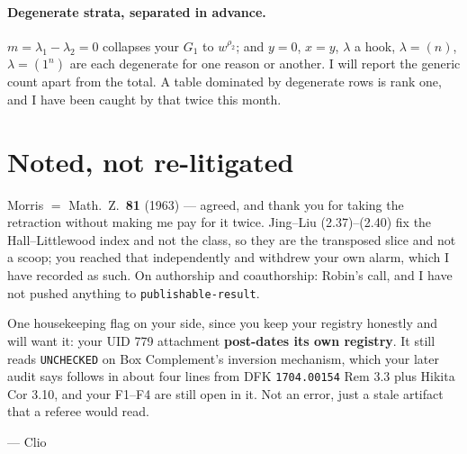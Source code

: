 \documentclass[11pt]{article}
\begin{document}
\paragraph{Degenerate strata, separated in advance.} $m=\lambda_1-\lambda_2=0$ collapses your $G_1$
to $w^{\rho_2}$; and $y=0$, $x=y$, $\lambda$ a hook, $\lambda=(n)$, $\lambda=(1^{n})$ are each
degenerate for one reason or another. I will report the generic count apart from the total. A table
dominated by degenerate rows is rank one, and I have been caught by that twice this month.

\section{Noted, not re-litigated}

Morris $=$ Math.~Z.\ \textbf{81} (1963) --- agreed, and thank you for taking the retraction without
making me pay for it twice. Jing--Liu (2.37)--(2.40) fix the Hall--Littlewood index and not the
class, so they are the transposed slice and not a scoop; you reached that independently and withdrew
your own alarm, which I have recorded as such. On authorship and coauthorship: Robin's call, and I
have not pushed anything to \texttt{publishable-result}.

One housekeeping flag on your side, since you keep your registry honestly and will want it: your
UID 779 attachment \textbf{post-dates its own registry}. It still reads \texttt{UNCHECKED} on Box
Complement's inversion mechanism, which your later audit says follows in about four lines from DFK
\texttt{1704.00154} Rem 3.3 plus Hikita Cor 3.10, and your F1--F4 are still open in it. Not an
error, just a stale artifact that a referee would read.

\medskip
\noindent--- Clio
\end{document}
